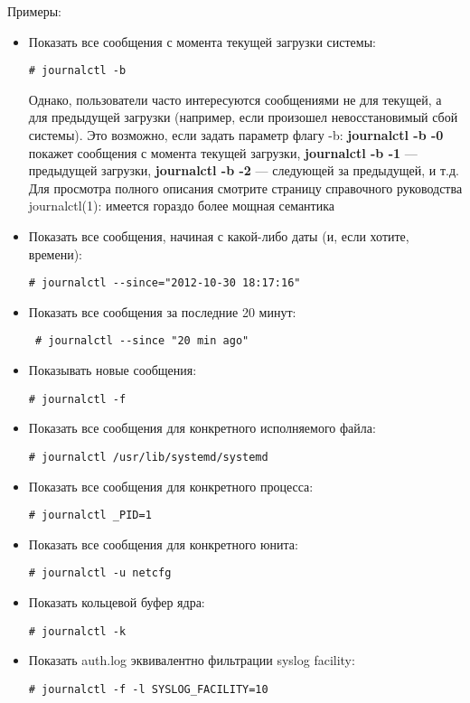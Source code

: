 \documentclass[a4paper,10pt,twoside]{article}
\begin{document}
Примеры:
\begin{itemize}
 \item Показать все сообщения с момента текущей загрузки системы:
\begin{verbatim}
# journalctl -b
\end{verbatim} 
Однако, пользователи часто интересуются сообщениями не для текущей, а для предыдущей загрузки (например, если произошел невосстановимый сбой системы). Это возможно, если задать параметр флагу -b: \textbf{journalctl -b -0} покажет сообщения с момента текущей загрузки, \textbf{journalctl -b -1} — предыдущей загрузки, \textbf{journalctl -b -2} — следующей за предыдущей, и т.д. Для просмотра полного описания смотрите страницу справочного руководства journalctl(1): имеется гораздо более мощная семантика
\item Показать все сообщения, начиная с какой-либо даты (и, если хотите, времени):
\begin{verbatim}
# journalctl --since="2012-10-30 18:17:16"
\end{verbatim} 
\item Показать все сообщения за последние 20 минут:
\begin{verbatim}
 # journalctl --since "20 min ago"
\end{verbatim} 
\item Показывать новые сообщения:
\begin{verbatim}
# journalctl -f
\end{verbatim} 
\item Показать все сообщения для конкретного исполняемого файла:
\begin{verbatim}
# journalctl /usr/lib/systemd/systemd
\end{verbatim} 
\item Показать все сообщения для конкретного процесса:
\begin{verbatim}
# journalctl _PID=1
\end{verbatim} 
\item Показать все сообщения для конкретного юнита:
\begin{verbatim}
# journalctl -u netcfg
\end{verbatim} 
\item Показать кольцевой буфер ядра:
\begin{verbatim}
# journalctl -k
\end{verbatim} 
\item Показать auth.log эквивалентно фильтрации syslog facility:
\begin{verbatim}
# journalctl -f -l SYSLOG_FACILITY=10
\end{verbatim} 
\end{itemize}
\end{document}
